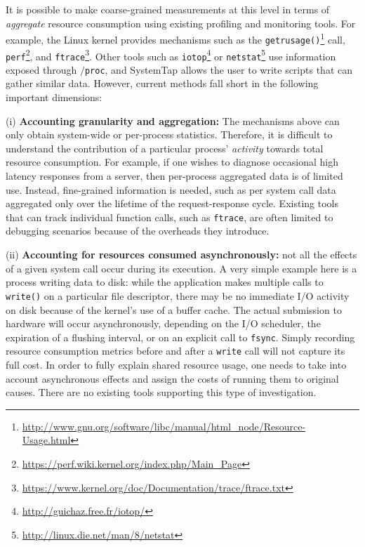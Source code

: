 \documentclass[letterpaper,twocolumn,10pt]{article}
\begin{document}
It is possible to make coarse-grained measurements at this level in terms of
\textit{aggregate} resource consumption using existing profiling and monitoring
tools. For example, the Linux kernel provides mechanisms such as the
\texttt{getrusage()}\footnote{\url{http://www.gnu.org/software/libc/manual/html_node/Resource-Usage.html}} call, \texttt{perf}\footnote{\url{https://perf.wiki.kernel.org/index.php/Main_Page}}, and \texttt{ftrace}\footnote{\url{https://www.kernel.org/doc/Documentation/trace/ftrace.txt}}. Other tools such
as \texttt{iotop}\footnote{\url{http://guichaz.free.fr/iotop/}} or \texttt{netstat}\footnote{\url{http://linux.die.net/man/8/netstat}} use information exposed through
\texttt{$/$proc}, and SystemTap allows the user to write scripts that can gather
similar data. However, current methods fall short in the following important
dimensions:

(i) \textbf{Accounting granularity and aggregation:} The mechanisms
above can only obtain system-wide or per-process statistics. Therefore, it is
difficult to understand the contribution of a particular process'
\textit{activity} towards total resource consumption. For example, if one
wishes to diagnose occasional high latency responses from a server, then
per-process aggregated data is of limited use. Instead, fine-grained information is
needed, such as per system call data aggregated only over the lifetime of the
request-response cycle. Existing tools that can track individual function calls,
such as \texttt{ftrace}, are often limited to debugging scenarios because of the overheads
they introduce.

(ii) \textbf{Accounting for resources consumed asynchronously:} not all the
effects of a given system call occur during its execution. A very simple example
here is a process writing data to disk: while the application makes multiple
calls to \texttt{write()} on a particular file descriptor, there may be no
immediate I/O activity on disk because of the kernel's use of a buffer cache.
The actual submission to hardware will occur asynchronously, depending on the
I/O scheduler, the expiration of a flushing interval, or on an explicit call to
\texttt{fsync}. Simply recording resource consumption metrics before and after a
\texttt{write} call will not capture its full cost. In order to fully explain
shared resource usage, one needs to take into account asynchronous effects and
assign the costs of running them to original causes. There are no existing tools
supporting this type of investigation.
\end{document}
